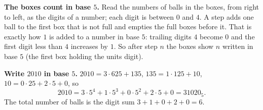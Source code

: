 \textbf{The boxes count in base $5$.} Read the numbers of balls in the boxes, from right to left, as the digits of a number; each digit is between $0$ and $4$. A step adds one ball to the first box that is not full and empties the full boxes before it. That is exactly how $1$ is added to a number in base $5$: trailing digits $4$ become $0$ and the first digit less than $4$ increases by $1$. So after step $n$ the boxes show $n$ written in base $5$ (the first box holding the units digit).

\textbf{Write $2010$ in base $5$.} $2010=3\cdot625+135$, $135=1\cdot125+10$, $10=0\cdot25+2\cdot5+0$, so
\[
2010=3\cdot5^4+1\cdot5^3+0\cdot5^2+2\cdot5+0=31020_5 .
\]
The total number of balls is the digit sum $3+1+0+2+0=\boxed{6}$.
